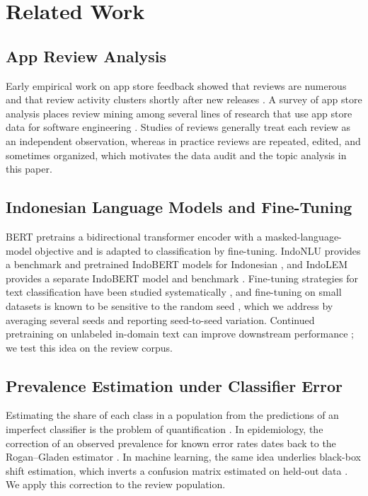 \documentclass[conference]{IEEEtran}
\begin{document}
\section{Related Work}\label{sec:related}
\subsection{App Review Analysis}
Early empirical work on app store feedback showed that reviews are numerous and that review activity clusters shortly after new releases \cite{b1}. A survey of app store analysis places review mining among several lines of research that use app store data for software engineering \cite{b2}. Studies of reviews generally treat each review as an independent observation, whereas in practice reviews are repeated, edited, and sometimes organized, which motivates the data audit and the topic analysis in this paper.

\subsection{Indonesian Language Models and Fine-Tuning}
BERT \cite{b3} pretrains a bidirectional transformer encoder with a masked-language-model objective and is adapted to classification by fine-tuning. IndoNLU provides a benchmark and pretrained IndoBERT models for Indonesian \cite{b4}, and IndoLEM provides a separate IndoBERT model and benchmark \cite{b5}. Fine-tuning strategies for text classification have been studied systematically \cite{b6}, and fine-tuning on small datasets is known to be sensitive to the random seed \cite{b7}, which we address by averaging several seeds and reporting seed-to-seed variation. Continued pretraining on unlabeled in-domain text can improve downstream performance \cite{b8}; we test this idea on the review corpus.

\subsection{Prevalence Estimation under Classifier Error}
Estimating the share of each class in a population from the predictions of an imperfect classifier is the problem of quantification \cite{b9}. In epidemiology, the correction of an observed prevalence for known error rates dates back to the Rogan--Gladen estimator \cite{b10}. In machine learning, the same idea underlies black-box shift estimation, which inverts a confusion matrix estimated on held-out data \cite{b11}. We apply this correction to the review population.
\end{document}
